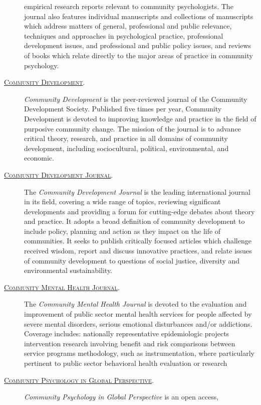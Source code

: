 \documentclass[]{tufte-handout}
\begin{document}
\begin{description}
empirical research reports relevant to community psychologists. The
journal also features individual manuscripts and collections of
manuscripts which address matters of general, professional and public
relevance, techniques and approaches in psychological practice,
professional development issues, and professional and public policy
issues, and reviews of books which relate directly to the major areas of
practice in community psychology.
\item[\href{http://www.tandfonline.com/toc/rcod20/current\#.VZgph2Bh1E5}{\textsc{Community Development}}.]
\emph{Community Development} is the peer-reviewed journal of the
Community Development Society. Published five times per year, Community
Development is devoted to improving knowledge and practice in the field
of purposive community change. The mission of the journal is to advance
critical theory, research, and practice in all domains of community
development, including sociocultural, political, environmental, and
economic.
\item[\href{http://cdj.oxfordjournals.org/}{\textsc{Community Development Journal}}.]
The \emph{Community Development Journal} is the leading international
journal in its field, covering a wide range of topics, reviewing
significant developments and providing a forum for cutting-edge debates
about theory and practice. It adopts a broad definition of community
development to include policy, planning and action as they impact on the
life of communities. It seeks to publish critically focused articles
which challenge received wisdom, report and discuss innovative
practices, and relate issues of community development to questions of
social justice, diversity and environmental sustainability.
\item[\href{http://link.springer.com/journal/10597}{\textsc{Community Mental Health Journal}}.]
The \emph{Community Mental Health Journal} is devoted to the evaluation
and improvement of public sector mental health services for people
affected by severe mental disorders, serious emotional disturbances
and/or addictions. Coverage includes: nationally representative
epidemiologic projects intervention research involving benefit and risk
comparisons between service programs methodology, such as
instrumentation, where particularly pertinent to public sector
behavioral health evaluation or research
\item[\href{http://siba-ese.unisalento.it/index.php/cpgp}{\textsc{Community Psychology in Global Perspective}}.]
\emph{Community Psychology in Global Perspective} is an open access,

\end{description}
\end{document}
